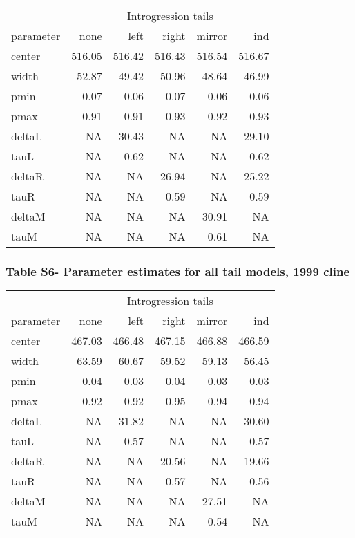 \documentclass[]{article}
\begin{document}
\begin{table}[H]
\centering\begingroup\fontsize{9}{11}\selectfont

\begin{tabular}{lrrrrr}
\toprule
\multicolumn{1}{c}{ } & \multicolumn{5}{c}{Introgression tails} \\
\cmidrule(l{3pt}r{3pt}){2-6}
parameter & none & left & right & mirror & ind\\
\midrule
center & 516.05 & 516.42 & 516.43 & 516.54 & 516.67\\
width & 52.87 & 49.42 & 50.96 & 48.64 & 46.99\\
pmin & 0.07 & 0.06 & 0.07 & 0.06 & 0.06\\
pmax & 0.91 & 0.91 & 0.93 & 0.92 & 0.93\\
deltaL & NA & 30.43 & NA & NA & 29.10\\
tauL & NA & 0.62 & NA & NA & 0.62\\
deltaR & NA & NA & 26.94 & NA & 25.22\\
tauR & NA & NA & 0.59 & NA & 0.59\\
deltaM & NA & NA & NA & 30.91 & NA\\
tauM & NA & NA & NA & 0.61 & NA\\
\bottomrule
\end{tabular}
\endgroup{}
\end{table}

\subsubsection{Table S6- Parameter estimates for all tail models, 1999
cline}\label{table-s6--parameter-estimates-for-all-tail-models-1999-cline}

\begin{table}[H]
\centering\begingroup\fontsize{9}{11}\selectfont

\begin{tabular}{lrrrrr}
\toprule
\multicolumn{1}{c}{ } & \multicolumn{5}{c}{Introgression tails} \\
\cmidrule(l{3pt}r{3pt}){2-6}
parameter & none & left & right & mirror & ind\\
\midrule
center & 467.03 & 466.48 & 467.15 & 466.88 & 466.59\\
width & 63.59 & 60.67 & 59.52 & 59.13 & 56.45\\
pmin & 0.04 & 0.03 & 0.04 & 0.03 & 0.03\\
pmax & 0.92 & 0.92 & 0.95 & 0.94 & 0.94\\
deltaL & NA & 31.82 & NA & NA & 30.60\\
tauL & NA & 0.57 & NA & NA & 0.57\\
deltaR & NA & NA & 20.56 & NA & 19.66\\
tauR & NA & NA & 0.57 & NA & 0.56\\
deltaM & NA & NA & NA & 27.51 & NA\\
tauM & NA & NA & NA & 0.54 & NA\\
\bottomrule
\end{tabular}
\endgroup{}
\end{table}
\end{document}
